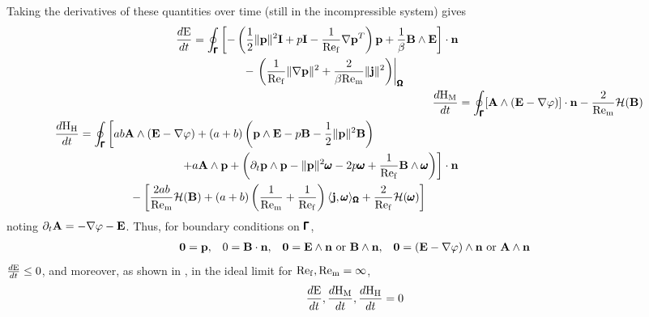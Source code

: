    Taking the derivatives of these quantities over time (still in the incompressible system) gives 
    \begin{align}
        \begin{split}
            \frac{d\mathrm{E}}{dt}  &=  \oint_{\pmb{\mathsf{\Gamma}}}\left[- \left(\frac{1}{2}\|\mathbf{p}\|^{2}\mathbf{I} + p\mathbf{I} - \frac{1}{\mathrm{Re}_{\mathrm{f}}}\nabla\mathbf{p}^{T}\right)\mathbf{p} + \frac{1}{\beta}\mathbf{B}\wedge\mathbf{E}\right]\cdot\mathbf{n}  \\
            &\;\;\;\;\;\;\;\;\;\;\;\;\;\;\;\;- \left.\left(\frac{1}{\mathrm{Re}_{\mathrm{f}}}\|\nabla\mathbf{p}\|^{2} + \frac{2}{\beta\mathrm{Re}_{\mathrm{m}}}\|\mathbf{j}\|^{2}\right)\right|_{\pmb{\mathsf{\Omega}}}
        \end{split}  \\
        \frac{d\mathrm{H}_{\mathrm{M}}}{dt}  &=  \oint_{\pmb{\mathsf{\Gamma}}}[\mathbf{A}\wedge(\mathbf{E} - \nabla\varphi)]\cdot\mathbf{n} - \frac{2}{\mathrm{Re}_{\mathrm{m}}}\mathcal{H}(\mathbf{B})  \\
        \begin{split}
            \frac{d\mathrm{H}_{\mathrm{H}}}{dt}  &=  \oint_{\pmb{\mathsf{\Gamma}}}\left[ab\mathbf{A}\wedge(\mathbf{E} - \nabla\varphi) + (a + b)\left(\mathbf{p}\wedge\mathbf{E} - p\mathbf{B} - \frac{1}{2}\|\mathbf{p}\|^{2}\mathbf{B}\right)\right.  \\
            &\;\;\;\;\;\;\;\;\;\;\;\;\;\;\;\;\;\;\;\;\;\;\;\;\;\;\;\;\;\;\;\;\left.+ a\mathbf{A}\wedge\mathbf{p} + \left(\partial_{t}\mathbf{p}\wedge\mathbf{p} - \|\mathbf{p}\|^{2}\pmb{\mathsf{\omega}} - 2p\pmb{\mathsf{\omega}} + \frac{1}{\mathrm{Re}_{\mathrm{f}}}\mathbf{B}\wedge\pmb{\mathsf{\omega}}\right)\right]\cdot\mathbf{n}  \\
            &\;\;\;\;\;\;\;\;\;\;\;\;\;\;\;\;- \left[\frac{2ab}{\mathrm{Re}_{\mathrm{m}}}\mathcal{H}(\mathbf{B}) + (a + b)\left(\frac{1}{\mathrm{Re}_{\mathrm{m}}} + \frac{1}{\mathrm{Re}_{\mathrm{f}}}\right)\langle\mathbf{j}, \pmb{\mathsf{\omega}}\rangle_{\pmb{\mathsf{\Omega}}} + \frac{2}{\mathrm{Re}_{\mathrm{f}}}\mathcal{H}(\pmb{\mathsf{\omega}})\right]
        \end{split}
    \end{align}
    noting $\partial_{t}\mathbf{A}  =  - \nabla\varphi - \mathbf{E}$. Thus, for boundary conditions on $\pmb{\mathsf{\Gamma}}$, 
    \begin{align}\label{eqn:canonical boundary conditions}
        \mathbf{0}  =  \mathbf{p},  &&
        0  =  \mathbf{B}\cdot\mathbf{n},  &&
        \mathbf{0}  =  \mathbf{E}\wedge\mathbf{n} \text{ or } \mathbf{B}\wedge\mathbf{n},  &&
        \mathbf{0}  =  (\mathbf{E} - \nabla\varphi)\wedge\mathbf{n} \text{ or } \mathbf{A}\wedge\mathbf{n}
    \end{align}
    $\frac{d\mathrm{E}}{dt}  \leq  0$, and moreover, as shown in \cite{LHF22}, in the ideal limit for $\mathrm{Re}_{\mathrm{f}}, \mathrm{Re}_{\mathrm{m}}  =  \infty$,
    \begin{equation}
        \frac{d\mathrm{E}}{dt}, \frac{d\mathrm{H}_{\mathrm{M}}}{dt}, \frac{d\mathrm{H}_{\mathrm{H}}}{dt}  =  0
    \end{equation}
    

